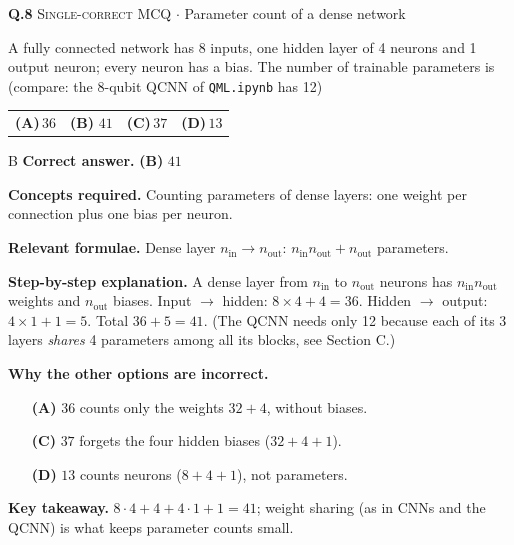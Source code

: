 \documentclass[11pt,a4paper]{article}
\newcommand{\optlabel}[1]{\textbf{(#1)}}
\newcommand{\correctlabel}[1]{\textcolor{okgreen}{\textbf{(#1)}\,\ding{51}}}
\newenvironment{qitem}[1]{\begin{list}{}{\setlength{\leftmargin}{3.3em}\setlength{\labelwidth}{3.1em}%
  \setlength{\labelsep}{0.2em}\setlength{\topsep}{3pt}\setlength{\parsep}{3pt}}\item[\textbf{Q.#1}\hfill]}{\end{list}}
\newcommand{\qsep}{\par\vspace{2pt}{\color{black!15}\hrule}\vspace{4pt}}
\newcommand{\qmeta}[2]{{\footnotesize\color{black!60}\textsc{#1} \;$\cdot$\; #2}\par}
\begin{document}
\begin{qitem}{8}
\qmeta{Single-correct MCQ}{Parameter count of a dense network}
A fully connected network has 8 inputs, one hidden layer of 4 neurons and 1 output neuron; every neuron has a
bias. The number of trainable parameters is (compare: the 8-qubit QCNN of \texttt{QML.ipynb} has 12)
\par\smallskip\noindent\begin{tabularx}{\linewidth}{@{}*{4}{L}@{}}
\optlabel{A}\,$36$ & \correctlabel{B}\,$41$ & \optlabel{C}\,$37$ & \optlabel{D}\,$13$
\end{tabularx}
\end{qitem}
\begin{solbox}{B}
\textbf{\color{brand}Correct answer.} \textcolor{okgreen}{\textbf{(B)}} $41$

\textbf{\color{brand}Concepts required.} Counting parameters of dense layers: one weight per connection plus one bias per neuron.

\textbf{\color{brand}Relevant formulae.} Dense layer $n_{\text{in}}\to n_{\text{out}}$: $n_{\text{in}}n_{\text{out}} + n_{\text{out}}$ parameters.

\textbf{\color{brand}Step-by-step explanation.} A dense layer from $n_{\text{in}}$ to $n_{\text{out}}$ neurons has $n_{\text{in}}n_{\text{out}}$ weights and $n_{\text{out}}$ biases.
Input $\to$ hidden: $8 \times 4 + 4 = 36$. Hidden $\to$ output: $4 \times 1 + 1 = 5$. Total $36 + 5 = 41$.
(The QCNN needs only 12 because each of its 3 layers \emph{shares} 4 parameters among all its blocks, see Section C.)

\textbf{\color{brand}Why the other options are incorrect.}
\begin{itemize}[leftmargin=2.4em, itemsep=1pt, topsep=2pt]
\item[\textbf{(A)}] $36$ counts only the weights $32 + 4$, without biases.
\item[\textbf{(C)}] $37$ forgets the four hidden biases ($32 + 4 + 1$).
\item[\textbf{(D)}] $13$ counts neurons ($8 + 4 + 1$), not parameters.
\end{itemize}
\textbf{\color{brand}Key takeaway.} $8\cdot4 + 4 + 4\cdot1 + 1 = 41$; weight sharing (as in CNNs and the QCNN) is what keeps parameter counts small.
\end{solbox}
\qsep
\end{document}

